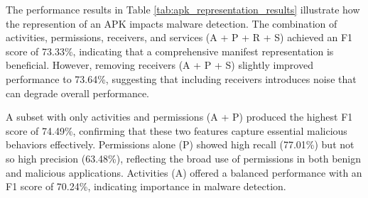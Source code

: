 \begin{table}[b!]
    \caption{\label{tab:apk_representation_results}%
    Performance of different APK representations using frozen modernBERT embeddings. Features are extracted from Android manifest.xml (A=Activities, P=Permissions, R=Receivers, S=Services). Results reported on time-based transcend subset split after five epochs.}
\end{table}

The performance results in Table \ref{tab:apk_representation_results} 
illustrate how the represention of an APK impacts malware detection. 
The combination of activities, permissions, receivers, and services (A + P + R + S) 
achieved an F1 score of 73.33\%, indicating that a comprehensive manifest representation 
is beneficial. However, removing receivers (A + P + S) 
slightly improved performance to 73.64\%, suggesting that including receivers 
introduces noise that can degrade overall performance.

A subset with only activities and permissions (A + P) produced the highest F1 
score of 74.49\%, confirming that these two features capture essential malicious behaviors 
effectively. Permissions alone (P) showed high recall (77.01\%) 
but not so high precision (63.48\%), 
reflecting the broad use of permissions in both benign and malicious applications. 
Activities (A) offered a balanced performance with an F1 score of 70.24\%, 
indicating  importance in malware detection.

